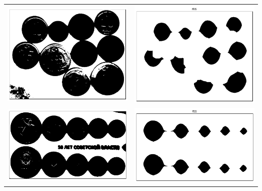 \documentclass[12pt, a4paper]{article}
\begin{document}
\begin{center}
		\begin{tabular}{c c}
			\includegraphics[width=8cm]{Money_9_bin.png} & \includegraphics[width=8cm]{Money_9_res.png} \\
			\includegraphics[width=8cm]{Money_10_bin.png} & \includegraphics[width=8cm]{Money_10_res.png} \\

\end{tabular}
\end{center}
\end{document}
